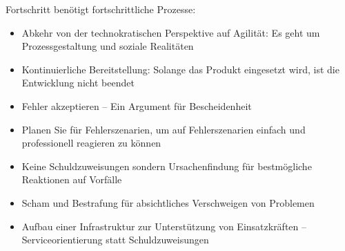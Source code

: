 
\begin{frame}[light]{}
  Fortschritt benötigt fortschrittliche Prozesse:
\end{frame}


\begin{frame}[light]{}
\begin{itemize}
  \item Abkehr von der technokratischen Perspektive auf Agilität: Es geht um Prozessgestaltung und soziale Realitäten %
  \item Kontinuierliche Bereitstellung: Solange das Produkt eingesetzt wird, ist die Entwicklung nicht beendet
  \item Fehler akzeptieren – Ein Argument für Bescheidenheit 
  \item     Planen Sie für Fehlerszenarien, um auf Fehlerszenarien einfach und professionell reagieren zu können
  \item     Keine Schuldzuweisungen sondern Ursachenfindung für bestmögliche Reaktionen auf Vorfälle
  \item     Scham und Bestrafung für absichtliches Verschweigen von Problemen
  \item     Aufbau einer Infrastruktur zur Unterstützung von Einsatzkräften – Serviceorientierung statt Schuldzuweisungen %
\end{itemize}
\end{frame}
